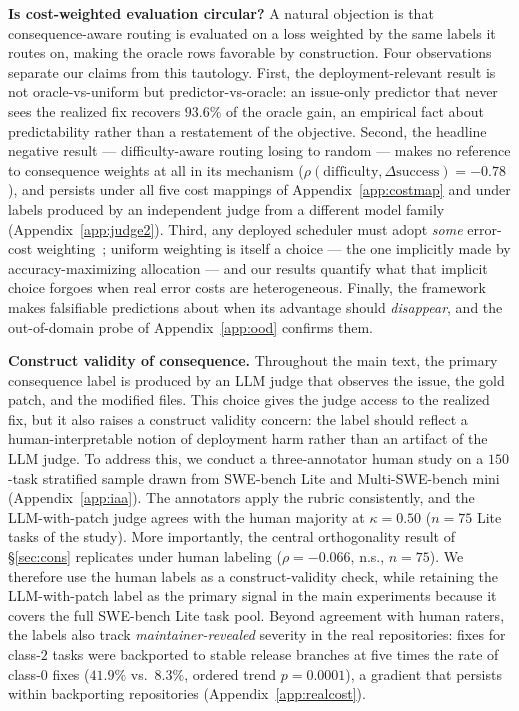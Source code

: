 \documentclass{article}
\begin{document}
\textbf{Is cost-weighted evaluation circular?} A natural objection
is that consequence-aware routing is evaluated on a loss weighted by
the same labels it routes on, making the oracle rows favorable by
construction. Four observations separate our claims from this
tautology. First, the deployment-relevant result is not
oracle-vs-uniform but predictor-vs-oracle: an issue-only predictor
that never sees the realized fix recovers $93.6\%$ of the oracle
gain, an empirical fact about predictability rather than a
restatement of the objective. Second, the headline negative result
--- difficulty-aware routing losing to random --- makes no reference
to consequence weights at all in its mechanism
($\rho(\mathrm{difficulty}, \Delta\mathrm{success}) = -0.78$), and
persists under all five cost mappings of Appendix~\ref{app:costmap}
and under labels produced by an independent judge from a different
model family (Appendix~\ref{app:judge2}). Third, any deployed
scheduler must adopt \emph{some} error-cost weighting~\citep{sayin2025rethinking}; uniform
weighting is itself a choice --- the one implicitly made by
accuracy-maximizing allocation --- and our results quantify what that
implicit choice forgoes when real error costs are heterogeneous.
Finally, the framework makes falsifiable predictions about when its
advantage should \emph{disappear}, and the out-of-domain probe of
Appendix~\ref{app:ood} confirms them.

\textbf{Construct validity of consequence.} Throughout the main text,
the primary consequence label is produced by an LLM judge that observes
the issue, the gold patch, and the modified files. This choice gives
the judge access to the realized fix, but it also raises a construct
validity concern: the label should reflect a human-interpretable notion
of deployment harm rather than an artifact of the LLM judge. To address
this, we conduct a three-annotator human study on a $150$-task
stratified sample drawn from SWE-bench Lite and Multi-SWE-bench mini
(Appendix~\ref{app:iaa}). The annotators apply the rubric consistently,
and the LLM-with-patch judge agrees with the human majority at
$\kappa = 0.50$ ($n{=}75$ Lite tasks of the study). More importantly,
the central orthogonality result of \S\ref{sec:cons} replicates under
human labeling ($\rho = -0.066$, n.s., $n{=}75$). We therefore use the human labels as a
construct-validity check, while retaining the LLM-with-patch label as
the primary signal in the main experiments because it covers the full
SWE-bench Lite task pool. Beyond agreement with human raters, the
labels also track \emph{maintainer-revealed} severity in the real
repositories: fixes for class-$2$ tasks were backported to stable
release branches at five times the rate of class-$0$ fixes ($41.9\%$
vs.\ $8.3\%$, ordered trend $p = 0.0001$), a gradient that persists
within backporting repositories (Appendix~\ref{app:realcost}).
\end{document}
